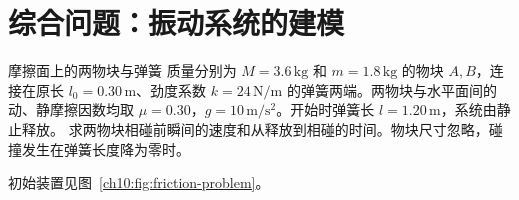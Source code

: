 \section{综合问题：振动系统的建模}

\begin{origexamplebox}{摩擦面上的两物块与弹簧}\label{ch10:ex:friction}
质量分别为 $M=3.6\,\mathrm{kg}$ 和 $m=1.8\,\mathrm{kg}$ 的物块 $A,B$，连接在原长
$l_0=0.30\,\mathrm m$、劲度系数 $k=24\,\mathrm{N/m}$ 的弹簧两端。两物块与水平面间的动、静摩擦因数均取
$\mu=0.30$，$g=10\,\mathrm{m/s^2}$。开始时弹簧长 $l=1.20\,\mathrm m$，系统由静止释放。
求两物块相碰前瞬间的速度和从释放到相碰的时间。物块尺寸忽略，碰撞发生在弹簧长度降为零时。

初始装置见图~\ref{ch10:fig:friction-problem}。
\chTenFrictionProblemFigure
\end{origexamplebox}
